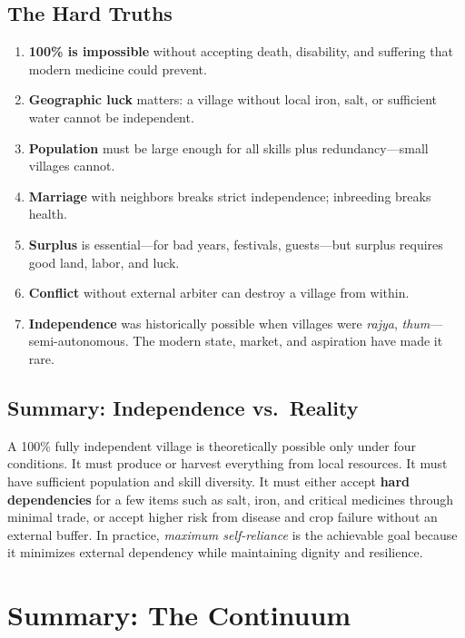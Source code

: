 \documentclass[11pt,a4paper]{article}
\begin{document}
\subsection{The Hard Truths}
\begin{enumerate}
    \item \textbf{100\% is impossible} without accepting death, disability, and suffering that modern medicine could prevent.
    \item \textbf{Geographic luck} matters: a village without local iron, salt, or sufficient water cannot be independent.
    \item \textbf{Population} must be large enough for all skills plus redundancy---small villages cannot.
    \item \textbf{Marriage} with neighbors breaks strict independence; inbreeding breaks health.
    \item \textbf{Surplus} is essential---for bad years, festivals, guests---but surplus requires good land, labor, and luck.
    \item \textbf{Conflict} without external arbiter can destroy a village from within.
    \item \textbf{Independence} was historically possible when villages were \textit{rajya}, \textit{thum}---semi-autonomous. 
    The modern state, market, and aspiration have made it rare.
\end{enumerate}

\subsection{Summary: Independence vs.\ Reality}
A 100\% fully independent village is theoretically possible only under four conditions. It must produce or harvest everything from 
local resources. It must have sufficient population and skill diversity. It must either accept \textbf{hard dependencies} 
for a few items such as salt, iron, and critical medicines through minimal trade, or accept higher risk from disease and 
crop failure without an external buffer. In practice, \textit{maximum self-reliance} is the achievable goal because it 
minimizes external dependency while maintaining dignity and resilience.

\section{Summary: The Continuum}
\end{document}
